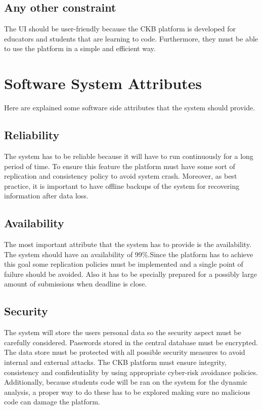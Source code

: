     


\subsection{Any other constraint}
The UI should be user-friendly because the CKB platform is developed for educators and students that are learning to code. Furthermore, they must be able to use the platform in a simple and efficient way.

\section{Software System Attributes}
Here are explained some  software side attributes that the system should provide.
\subsection{Reliability}
The system has to be reliable because it will have to run continuously for a long period of time.
To ensure this feature the platform must have some sort of replication and consistency policy to avoid system crash. Moreover, as best practice, it is important to have offline backups of the system for recovering information after data loss.
\subsection{Availability}
The most important attribute that the system has to provide is the availability. The system should have an availability of 99\%.Since the platform has to achieve this goal some replication policies must be implemented and a single point of failure should be avoided. Also it has to be specially prepared for a possibly large amount of submissions when deadline is close.
\subsection{Security}
The system will store the users personal data so the security aspect must be carefully considered. Passwords stored in the central database must be encrypted.
The data store must be protected with all possible security measures to avoid internal and external attacks. The CKB platform must ensure integrity, consistency and confidentiality by using appropriate cyber-risk avoidance policies.
Additionally, because students code will be ran on the system for the dynamic analysis, a proper way to do these has to be explored making sure no malicious code can  damage the platform.

